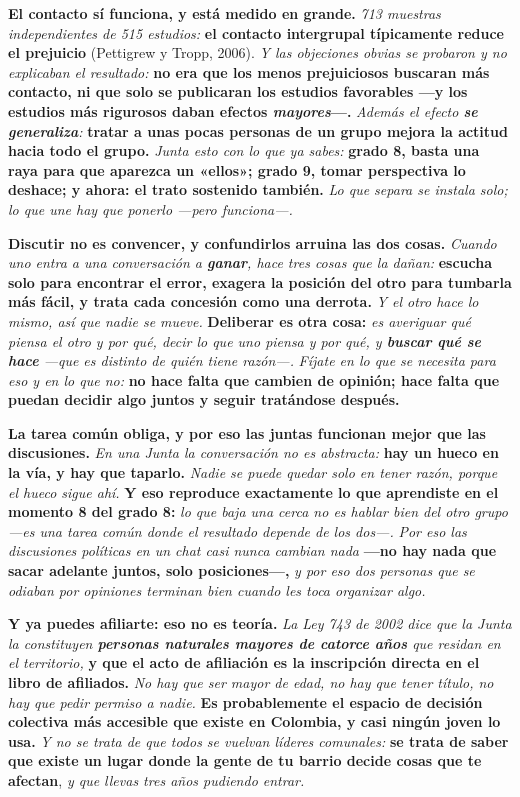 \documentclass[11pt,letterpaper]{article}
\newcommand{\milcpaso}[3]{%
\Needspace{4\baselineskip}%
\begin{tcolorbox}[enhanced,colback=white,colframe=milcLinea,arc=1.5mm,boxrule=.9pt,
  left=14mm,right=4mm,top=3mm,bottom=3mm,before skip=4pt,after skip=4pt,
  fontupper=\RaggedRight,
  overlay={\node[anchor=north west,circle,fill=#2,text=white,inner sep=0pt,
    minimum size=7.4mm,font=\sffamily\bfseries\small]
    at ([xshift=3.6mm,yshift=-3.2mm]frame.north west) {#1};}]
#3
\end{tcolorbox}}
\begin{document}
\milcpaso{1}{milcTurquesa}{\textbf{El contacto sí funciona, y está medido en grande.} \emph{713 muestras independientes de 515 estudios:} \textbf{el contacto intergrupal típicamente reduce el prejuicio} (Pettigrew y Tropp, 2006). \emph{Y las objeciones obvias se probaron y no explicaban el resultado:} \textbf{no era que los menos prejuiciosos buscaran más contacto, ni que solo se publicaran los estudios favorables ---y los estudios más rigurosos daban efectos \emph{mayores}---.} \emph{Además el efecto \textbf{se generaliza}:} \textbf{tratar a unas pocas personas de un grupo mejora la actitud hacia todo el grupo.} \emph{Junta esto con lo que ya sabes:} \textbf{grado 8, basta una raya para que aparezca un «ellos»; grado 9, tomar perspectiva lo deshace; y ahora: el trato sostenido también.} \emph{Lo que separa se instala solo; lo que une hay que ponerlo ---pero funciona---.}}
\milcpaso{2}{milcTurquesa}{\textbf{Discutir no es convencer, y confundirlos arruina las dos cosas.} \emph{Cuando uno entra a una conversación a \textbf{ganar}, hace tres cosas que la dañan:} \textbf{escucha solo para encontrar el error, exagera la posición del otro para tumbarla más fácil, y trata cada concesión como una derrota.} \emph{Y el otro hace lo mismo, así que nadie se mueve.} \textbf{Deliberar es otra cosa:} \emph{es averiguar qué piensa el otro y por qué, decir lo que uno piensa y por qué, y \textbf{buscar qué se hace} ---que es distinto de quién tiene razón---.} \emph{Fíjate en lo que se necesita para eso y en lo que no:} \textbf{no hace falta que cambien de opinión; hace falta que puedan decidir algo juntos y seguir tratándose después.}}
\milcpaso{3}{milcTurquesa}{\textbf{La tarea común obliga, y por eso las juntas funcionan mejor que las discusiones.} \emph{En una Junta la conversación no es abstracta:} \textbf{hay un hueco en la vía, y hay que taparlo.} \emph{Nadie se puede quedar solo en tener razón, porque el hueco sigue ahí.} \textbf{Y eso reproduce exactamente lo que aprendiste en el momento 8 del grado 8:} \emph{lo que baja una cerca no es hablar bien del otro grupo ---es una tarea común donde el resultado depende de los dos---.} \emph{Por eso las discusiones políticas en un chat casi nunca cambian nada} \textbf{---no hay nada que sacar adelante juntos, solo posiciones---,} \emph{y por eso dos personas que se odiaban por opiniones terminan bien cuando les toca organizar algo.}}
\milcpaso{4}{milcTurquesa}{\textbf{Y ya puedes afiliarte: eso no es teoría.} \emph{La Ley 743 de 2002 dice que la Junta la constituyen \textbf{personas naturales mayores de catorce años} que residan en el territorio,} \textbf{y que el acto de afiliación es la \textbf{inscripción directa en el libro de afiliados}.} \emph{No hay que ser mayor de edad, no hay que tener título, no hay que pedir permiso a nadie.} \textbf{Es probablemente el espacio de decisión colectiva más accesible que existe en Colombia, y casi ningún joven lo usa.} \emph{Y no se trata de que todos se vuelvan líderes comunales:} \textbf{se trata de saber que existe un lugar donde la gente de tu barrio decide cosas que te afectan}, \emph{y que llevas tres años pudiendo entrar.}}
\end{document}
